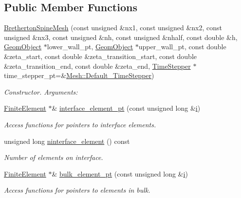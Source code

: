 \subsection*{Public Member Functions}
\begin{DoxyCompactItemize}
\item 
\hyperlink{classoomph_1_1BrethertonSpineMesh_a0e9c404141ee65b000ab4d1fdc4f11da}{Bretherton\+Spine\+Mesh} (const unsigned \&nx1, const unsigned \&nx2, const unsigned \&nx3, const unsigned \&nh, const unsigned \&nhalf, const double \&h, \hyperlink{classoomph_1_1GeomObject}{Geom\+Object} $\ast$lower\+\_\+wall\+\_\+pt, \hyperlink{classoomph_1_1GeomObject}{Geom\+Object} $\ast$upper\+\_\+wall\+\_\+pt, const double \&zeta\+\_\+start, const double \&zeta\+\_\+transition\+\_\+start, const double \&zeta\+\_\+transition\+\_\+end, const double \&zeta\+\_\+end, \hyperlink{classoomph_1_1TimeStepper}{Time\+Stepper} $\ast$time\+\_\+stepper\+\_\+pt=\&\hyperlink{classoomph_1_1Mesh_a12243d0fee2b1fcee729ee5a4777ea10}{Mesh\+::\+Default\+\_\+\+Time\+Stepper})
\begin{DoxyCompactList}\small\item\em Constructor. Arguments\+: \end{DoxyCompactList}\item 
\hyperlink{classoomph_1_1FiniteElement}{Finite\+Element} $\ast$\& \hyperlink{classoomph_1_1BrethertonSpineMesh_a3d14f3985d718867099747e5b3750fec}{interface\+\_\+element\+\_\+pt} (const unsigned long \&\hyperlink{cfortran_8h_adb50e893b86b3e55e751a42eab3cba82}{i})
\begin{DoxyCompactList}\small\item\em Access functions for pointers to interface elements. \end{DoxyCompactList}\item 
unsigned long \hyperlink{classoomph_1_1BrethertonSpineMesh_ae1ecd7c00fe1032e1ee16d7a98156d5c}{ninterface\+\_\+element} () const
\begin{DoxyCompactList}\small\item\em Number of elements on interface. \end{DoxyCompactList}\item 
\hyperlink{classoomph_1_1FiniteElement}{Finite\+Element} $\ast$\& \hyperlink{classoomph_1_1BrethertonSpineMesh_a2fc2b4be08ff93fa313281f82e19d92e}{bulk\+\_\+element\+\_\+pt} (const unsigned long \&\hyperlink{cfortran_8h_adb50e893b86b3e55e751a42eab3cba82}{i})
\begin{DoxyCompactList}\small\item\em Access functions for pointers to elements in bulk. \end{DoxyCompactList}\item 

\end{DoxyCompactItemize}
